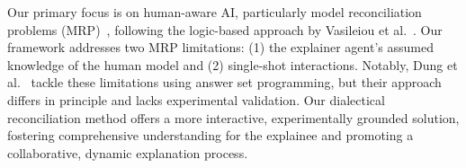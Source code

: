 \documentclass{ecai}
\begin{document}
\begin{table}
 \centering
{}
\caption{Comparison of the four dialogue types on a topic $\varphi$ and two agent KBs $KB_i$ (initiating) and $KB_j$ (participating).}
\label{dialogue_types}
\end{table}


Our primary focus is on human-aware AI, particularly model reconciliation problems (MRP)~\cite{sreedharan2022explainable, chakraborti2017plan, sreedharan2021using, son2021model, vas21, kumar2022vizxp}, following the logic-based approach by Vasileiou et al.~\cite{vas21, vasileioulogic}. Our framework addresses two MRP limitations: (1) the explainer agent's assumed knowledge of the human model and (2) single-shot interactions. Notably, Dung et al.~\cite{DungS22a} tackle these limitations using answer set programming, but their approach differs in principle and lacks experimental validation. Our dialectical reconciliation method offers a more interactive, experimentally grounded solution, fostering comprehensive understanding for the explainee and promoting a collaborative, dynamic explanation process.
\end{document}
